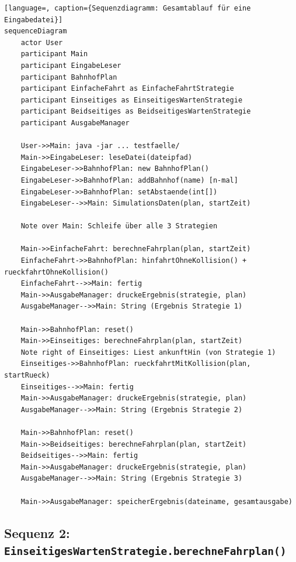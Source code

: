 \documentclass[12pt,a4paper]{article}
\begin{document}
\begin{lstlisting}[language=, caption={Sequenzdiagramm: Gesamtablauf für eine Eingabedatei}]
sequenceDiagram
    actor User
    participant Main
    participant EingabeLeser
    participant BahnhofPlan
    participant EinfacheFahrt as EinfacheFahrtStrategie
    participant Einseitiges as EinseitigesWartenStrategie
    participant Beidseitiges as BeidseitigesWartenStrategie
    participant AusgabeManager

    User->>Main: java -jar ... testfaelle/
    Main->>EingabeLeser: leseDatei(dateipfad)
    EingabeLeser->>BahnhofPlan: new BahnhofPlan()
    EingabeLeser->>BahnhofPlan: addBahnhof(name) [n-mal]
    EingabeLeser->>BahnhofPlan: setAbstaende(int[])
    EingabeLeser-->>Main: SimulationsDaten(plan, startZeit)

    Note over Main: Schleife über alle 3 Strategien

    Main->>EinfacheFahrt: berechneFahrplan(plan, startZeit)
    EinfacheFahrt->>BahnhofPlan: hinfahrtOhneKollision() + rueckfahrtOhneKollision()
    EinfacheFahrt-->>Main: fertig
    Main->>AusgabeManager: druckeErgebnis(strategie, plan)
    AusgabeManager-->>Main: String (Ergebnis Strategie 1)

    Main->>BahnhofPlan: reset()
    Main->>Einseitiges: berechneFahrplan(plan, startZeit)
    Note right of Einseitiges: Liest ankunftHin (von Strategie 1)
    Einseitiges->>BahnhofPlan: rueckfahrtMitKollision(plan, startRueck)
    Einseitiges-->>Main: fertig
    Main->>AusgabeManager: druckeErgebnis(strategie, plan)
    AusgabeManager-->>Main: String (Ergebnis Strategie 2)

    Main->>BahnhofPlan: reset()
    Main->>Beidseitiges: berechneFahrplan(plan, startZeit)
    Beidseitiges-->>Main: fertig
    Main->>AusgabeManager: druckeErgebnis(strategie, plan)
    AusgabeManager-->>Main: String (Ergebnis Strategie 3)

    Main->>AusgabeManager: speicherErgebnis(dateiname, gesamtausgabe)
\end{lstlisting}

\subsection{Sequenz 2: \texttt{EinseitigesWartenStrategie.berechneFahrplan()}}
\end{document}
